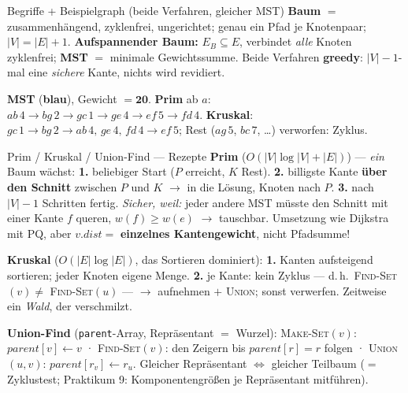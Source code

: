 \documentclass[10pt,a4paper]{article}
\begin{document}
\begin{defbox}{Begriffe + Beispielgraph (beide Verfahren, gleicher MST)}
\small
\textbf{Baum} $=$ zusammenhängend, zyklenfrei, ungerichtet; genau ein Pfad je Knotenpaar;
$|V| = |E| + 1$. \textbf{Aufspannender Baum:} $E_B \subseteq E$, verbindet \emph{alle} Knoten
zyklenfrei; \textbf{MST} $=$ minimale Gewichtssumme. Beide Verfahren \textbf{greedy}:
$|V|{-}1$-mal eine \emph{sichere} Kante, nichts wird revidiert.
\par\vspace{3pt}\centering
{}
\par\vspace{1pt}\raggedright
\textbf{MST} (\textcolor{defblue}{\textbf{blau}}), Gewicht $= \mathbf{20}$.
\textbf{Prim} ab $a$: $ab\,4 \to bg\,2 \to gc\,1 \to ge\,4 \to ef\,5 \to fd\,4$.\quad
\textbf{Kruskal}: $gc\,1 \to bg\,2 \to ab\,4,\,ge\,4,\,fd\,4 \to ef\,5$; Rest
($ag\,5$, $bc\,7$, \dots) verworfen: Zyklus.
\end{defbox}

\begin{defbox}{Prim / Kruskal / Union-Find — Rezepte}
\small
\textbf{Prim} ($O(|V|\log|V|{+}|E|)$) — \emph{ein} Baum wächst: \textbf{1.} beliebiger Start
($P$ erreicht, $K$ Rest). \textbf{2.} billigste Kante \textbf{über den Schnitt} zwischen $P$ und
$K$ $\to$ in die Lösung, Knoten nach $P$. \textbf{3.} nach $|V|{-}1$ Schritten fertig.
\emph{Sicher, weil:} jeder andere MST müsste den Schnitt mit einer Kante $f$ queren,
$w(f) \ge w(e)$ $\to$ tauschbar. Umsetzung wie Dijkstra mit PQ, aber $v.dist =$
\textbf{einzelnes Kantengewicht}, nicht Pfadsumme!\par
\textbf{Kruskal} ($O(|E|\log|E|)$, das Sortieren dominiert): \textbf{1.} Kanten aufsteigend
sortieren; jeder Knoten eigene Menge. \textbf{2.} je Kante: kein Zyklus — d.\,h.\
\textsc{Find-Set}$(v) \neq$ \textsc{Find-Set}$(u)$ — $\to$ aufnehmen $+$ \textsc{Union}; sonst
verwerfen. Zeitweise ein \emph{Wald}, der verschmilzt.\par
\textbf{Union-Find} (\texttt{parent}-Array, Repräsentant $=$ Wurzel):
\textsc{Make-Set}$(v)$: $parent[v] \leftarrow v$ ·
\textsc{Find-Set}$(v)$: den Zeigern bis $parent[r] = r$ folgen ·
\textsc{Union}$(u,v)$: $parent[r_v] \leftarrow r_u$. Gleicher Repräsentant $\Leftrightarrow$
gleicher Teilbaum ($=$ Zyklustest; Praktikum 9: Komponentengrößen je Repräsentant mitführen).
\end{defbox}
\end{document}
